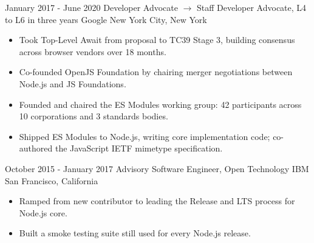 \documentclass[10pt,a4paper,sans]{moderncv}   %
\begin{document}
\cventry
  {January 2017 - June 2020}
  {Developer Advocate $\rightarrow$ Staff Developer Advocate, L4 to L6 in three years}
  {Google}
  {New York City, New York}{}
  {
    \vspace{0.5em}
    \begin{itemize}
      \item Took Top-Level Await from proposal to TC39 Stage 3, building consensus across browser vendors over 18 months.
      \item Co-founded OpenJS Foundation by chairing merger negotiations between Node.js and JS Foundations.
      \item Founded and chaired the ES Modules working group: 42 participants across 10 corporations and 3 standards bodies.
      \item Shipped ES Modules to Node.js, writing core implementation code; co-authored the JavaScript IETF mimetype specification.
    \end{itemize}
    \vspace{0.5em}
  }

\cventry
  {October 2015 - January 2017}
  {Advisory Software Engineer, Open Technology}
  {IBM}
  {San Francisco, California}{}
  {
    \vspace{0.5em}
    \begin{itemize}
      \item Ramped from new contributor to leading the Release and LTS process for Node.js core.
      \item Built a smoke testing suite still used for every Node.js release.
    \end{itemize}
    \vspace{0.5em}
  }


\end{document}
